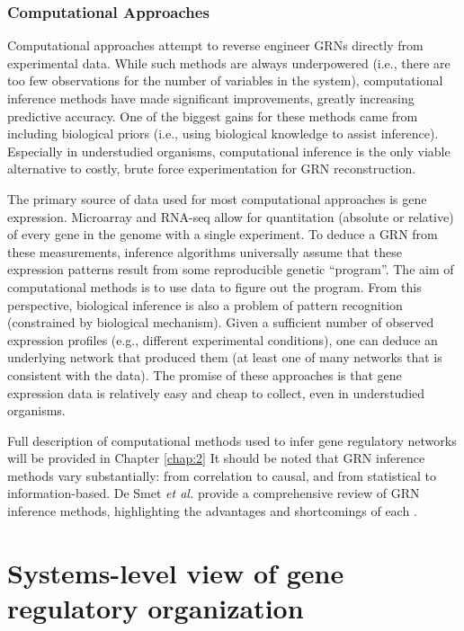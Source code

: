 \subsubsection{Computational Approaches}

Computational approaches attempt to reverse engineer GRNs directly from experimental data. While such methods are always underpowered (i.e., there are too few observations for the number of variables in the system), computational inference methods have made significant improvements, greatly increasing predictive accuracy. One of the biggest gains for these methods came from including biological priors (i.e., using biological knowledge to assist inference). Especially in understudied organisms, computational inference is the only viable alternative to costly, brute force experimentation for GRN reconstruction. 

The primary source of data used for most computational approaches is gene expression. Microarray and RNA-seq allow for quantitation (absolute or relative) of every gene in the genome with a single experiment. To deduce a GRN from these measurements, inference algorithms universally assume that these expression patterns result from some reproducible genetic ``program''. The aim of computational methods is to use data to figure out the program. From this perspective, biological inference is also a problem of pattern recognition (constrained by biological mechanism). Given a sufficient number of observed expression profiles (e.g., different experimental conditions), one can deduce an underlying network that produced them (at least one of many networks that is consistent with the data). The promise of these approaches is that gene expression data is relatively easy and cheap to collect, even in understudied organisms. 

 Full description of computational methods used to infer gene regulatory networks will be provided in Chapter \ref{chap:2} It should be noted that GRN inference methods vary substantially: from correlation to causal, and from statistical to information-based. De Smet \textit{et al.} provide a comprehensive review of GRN inference methods, highlighting the advantages and shortcomings of each \cite{de_smet_advantages_2010}. 

\section{Systems-level view of gene regulatory organization}

